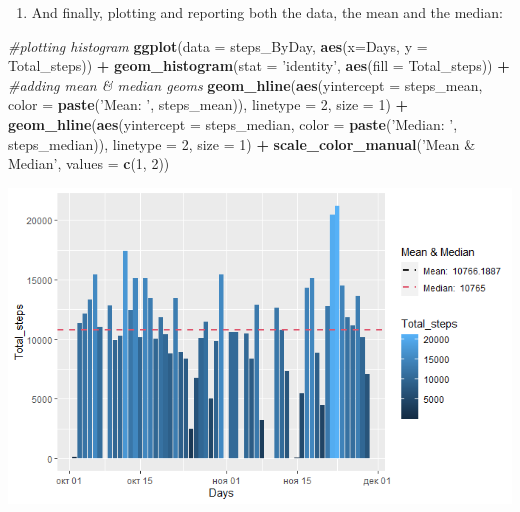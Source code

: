 \documentclass[
]{article}
\newenvironment{Shaded}{\begin{snugshade}}{\end{snugshade}}
\newcommand{\CommentTok}[1]{\textcolor[rgb]{0.56,0.35,0.01}{\textit{#1}}}
\newcommand{\DataTypeTok}[1]{\textcolor[rgb]{0.13,0.29,0.53}{#1}}
\newcommand{\DecValTok}[1]{\textcolor[rgb]{0.00,0.00,0.81}{#1}}
\newcommand{\KeywordTok}[1]{\textcolor[rgb]{0.13,0.29,0.53}{\textbf{#1}}}
\newcommand{\NormalTok}[1]{#1}
\newcommand{\OperatorTok}[1]{\textcolor[rgb]{0.81,0.36,0.00}{\textbf{#1}}}
\newcommand{\StringTok}[1]{\textcolor[rgb]{0.31,0.60,0.02}{#1}}
\providecommand{\tightlist}{%
  \setlength{\itemsep}{0pt}\setlength{\parskip}{0pt}}
\begin{document}
\begin{enumerate}
\def\labelenumi{\arabic{enumi}.}
\setcounter{enumi}{2}
\tightlist
\item
  And finally, plotting and reporting both the data, the mean and the
  median:
\end{enumerate}

\begin{Shaded}
\begin{Highlighting}[]
\CommentTok{#plotting histogram}
\KeywordTok{ggplot}\NormalTok{(}\DataTypeTok{data =}\NormalTok{ steps_ByDay, }\KeywordTok{aes}\NormalTok{(}\DataTypeTok{x=}\NormalTok{Days, }\DataTypeTok{y =}\NormalTok{ Total_steps)) }\OperatorTok{+}
\StringTok{      }\KeywordTok{geom_histogram}\NormalTok{(}\DataTypeTok{stat =} \StringTok{'identity'}\NormalTok{, }\KeywordTok{aes}\NormalTok{(}\DataTypeTok{fill =}\NormalTok{ Total_steps)) }\OperatorTok{+}
\CommentTok{#adding mean & median geoms}
\StringTok{      }\KeywordTok{geom_hline}\NormalTok{(}\KeywordTok{aes}\NormalTok{(}\DataTypeTok{yintercept =}\NormalTok{ steps_mean, }\DataTypeTok{color =} \KeywordTok{paste}\NormalTok{(}\StringTok{'Mean: '}\NormalTok{, steps_mean)), }
                 \DataTypeTok{linetype =} \DecValTok{2}\NormalTok{, }\DataTypeTok{size =} \DecValTok{1}\NormalTok{) }\OperatorTok{+}
\StringTok{      }\KeywordTok{geom_hline}\NormalTok{(}\KeywordTok{aes}\NormalTok{(}\DataTypeTok{yintercept =}\NormalTok{ steps_median, }\DataTypeTok{color =} \KeywordTok{paste}\NormalTok{(}\StringTok{'Median: '}\NormalTok{, steps_median)), }
                 \DataTypeTok{linetype =} \DecValTok{2}\NormalTok{, }\DataTypeTok{size =} \DecValTok{1}\NormalTok{) }\OperatorTok{+}
\StringTok{      }\KeywordTok{scale_color_manual}\NormalTok{(}\StringTok{'Mean & Median'}\NormalTok{, }\DataTypeTok{values =} \KeywordTok{c}\NormalTok{(}\DecValTok{1}\NormalTok{, }\DecValTok{2}\NormalTok{))}
\end{Highlighting}
\end{Shaded}

\includegraphics[width=1\linewidth]{./Rplot_1}
\end{document}
